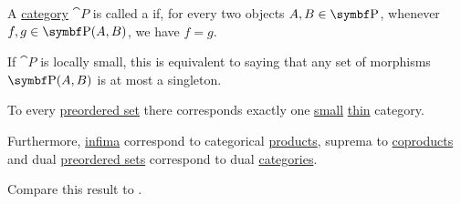 \begin{definition}\label{def:thin_category}\mcite\cite{nLab:thin_category}
  A \hyperref[def:category]{category} \( \cat{P} \) is called a  if, for every two objects \( A, B \in \bfop{P} \), whenever \( f, g \in \bfop{P}(A, B) \), we have \( f = g \).

  If \( \cat{P} \) is locally small, this is equivalent to saying that any set of morphisms \( \bfop{P}(A, B) \) is at most a singleton.
\end{definition}

\begin{proposition}\label{thm:preorder_category_correspondence}
  To every \hyperref[def:preordered_set]{preordered set} there corresponds exactly one \hyperref[def:category_cardinality]{small} \hyperref[def:thin_category]{thin} category.

  Furthermore, \hyperref[def:preordered_set/supremum_infimum]{infima} correspond to categorical \hyperref[def:categorical_product]{products}, suprema to \hyperref[def:categorical_coproduct]{coproducts} and dual \hyperref[def:preordered_set/dual]{preordered sets} correspond to dual \hyperref[def:opposite_category]{categories}.

  Compare this result to .
\end{proposition}

